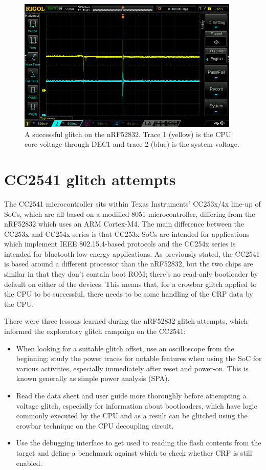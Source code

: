 \begin{figure}
\centering
\includegraphics[width=4.16667in,height=\textheight]{res/nrf52832_successful.png}
\caption{A successful glitch on the nRF52832. Trace 1 (yellow) is the
CPU core voltage through DEC1 and trace 2 (blue) is the system voltage.
\label{img_nrf52832_successful}}
\end{figure}

\hypertarget{cc2541-glitch-attempts}{%
\section{CC2541 glitch attempts}\label{cc2541-glitch-attempts}}

The CC2541 microcontroller sits within Texas Instruments' CC253x/4x
line-up of SoCs, which are all based on a modified 8051 microcontroller,
differing from the nRF52832 which uses an ARM Cortex-M4. The main
difference between the CC253x and CC254x series is that CC253x SoCs are
intended for applications which implement IEEE 802.15.4-based protocols
and the CC254x series is intended for bluetooth low-energy applications.
As previously stated, the CC2541 is based around a different processor
than the nRF52832, but the two chips are similar in that they don't
contain boot ROM; there's no read-only bootloader by default on either
of the devices. This means that, for a crowbar glitch applied to the CPU
to be successful, there needs to be some handling of the CRP data by the
CPU.

There were three lessons learned during the nRF52832 glitch attempts,
which informed the exploratory glitch campaign on the CC2541:

\begin{itemize}
\tightlist
\item
  When looking for a suitable glitch offset, use an oscilloscope from
  the beginning; study the power traces for notable features when using
  the SoC for various activities, especially immediately after reset and
  power-on. This is known generally as simple power analysis (SPA).
\item
  Read the data sheet and user guide more thoroughly before attempting a
  voltage glitch, especially for information about bootloaders, which
  have logic commonly executed by the CPU and as a result can be
  glitched using the crowbar technique on the CPU decoupling circuit.
\item
  Use the debugging interface to get used to reading the flash contents
  from the target and define a benchmark against which to check whether
  CRP is still enabled.
\end{itemize}

